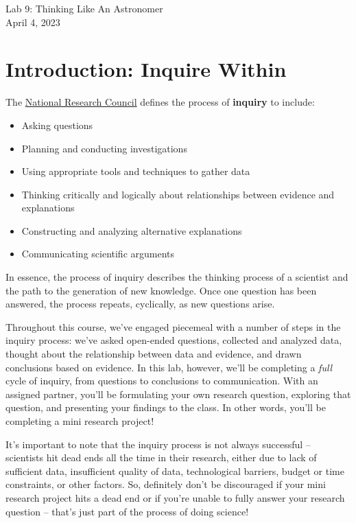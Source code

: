 \documentclass[11pt]{article}%
\begin{document}
\begin{center}
\huge{Lab 9: Thinking Like An Astronomer}\\ \medskip \Large{April 4, 2023}
\end{center}

\section{Introduction: Inquire Within}

\noindent The \href{https://eric.ed.gov/?id=ED391690}{National Research Council} defines the process of \textbf{inquiry} to include:
\begin{itemize}
    \item Asking questions
    \item Planning and conducting investigations
    \item Using appropriate tools and techniques to gather data
    \item Thinking critically and logically about relationships between evidence and explanations
    \item Constructing and analyzing alternative explanations
    \item Communicating scientific arguments
\end{itemize}
In essence, the process of inquiry describes the thinking process of a scientist and the path to the generation of new knowledge. Once one question has been answered, the process repeats, cyclically, as new questions arise. 

Throughout this course, we've engaged piecemeal with a number of steps in the inquiry process: we've asked open-ended questions, collected and analyzed data, thought about the relationship between data and evidence, and drawn conclusions based on evidence. In this lab, however, we'll be completing a \emph{full} cycle of inquiry, from questions to conclusions to communication. With an assigned partner, you'll be formulating your own research question, exploring that question, and presenting your findings to the class. In other words, you'll be completing a mini research project!

It’s important to note that the inquiry process is not always successful -- scientists hit dead ends all the time in their research, either due to lack of sufficient data, insufficient quality of data, technological barriers, budget or time constraints, or other factors. So, definitely don’t be discouraged if your mini research project hits a dead end or if you’re unable to fully answer your research question -- that’s just part of the process of doing science!
\end{document}
